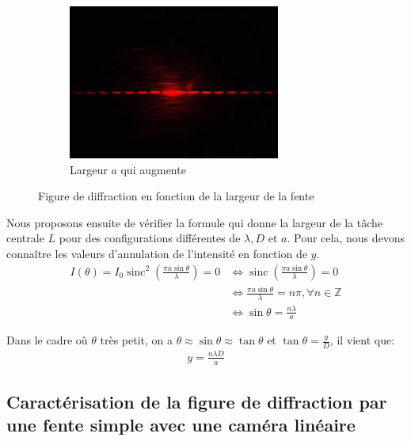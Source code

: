 \documentclass[12pt]{article}
\newcommand{\sinc}{\operatorname{sinc}}
\begin{document}
\begin{figure}[h!]
\begin{subfigure}{.33\textwidth}
        \includegraphics[width=.9\linewidth]{img/a_remplacer_par_nos_images.jpg}
        \caption{Largeur $a$ qui augmente}
        \label{fig:sfig3}
      \end{subfigure}
    \caption{Figure de diffraction en fonction de la largeur de la fente}
    \label{fig:fig}
\end{figure}

\break
Nous proposons ensuite de vérifier la formule qui donne la largeur de la tâche centrale $L$ pour des configurations différentes de $\lambda, D$ et $a$. Pour cela, nous devons
connaître les valeurs d'annulation de l'intensité en fonction de $y$.
\begin{align*}
    I(\theta) = I_0 \sinc^2\left(\frac{\pi a \sin \theta}{\lambda}\right) = 0 & \Leftrightarrow \sinc\left(\frac{\pi a \sin \theta}{\lambda}\right) = 0 \\
    & \Leftrightarrow \frac{\pi a \sin \theta}{\lambda} = n\pi, \forall n \in \mathbb{Z} \\
    & \Leftrightarrow \sin \theta = \frac{n\lambda}{a}
\end{align*}

Dans le cadre où $\theta$ très petit, on a $\theta \approx \sin \theta \approx \tan \theta $ et $\tan \theta = \frac{y}{D}$, il vient que:
\begin{align}
    y = \frac{n\lambda D}{a}
\end{align}

\break
\subsection{Caractérisation de la figure de diffraction par une fente simple avec une caméra linéaire}
\end{document}
